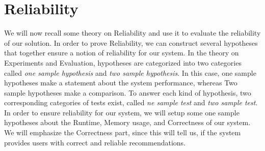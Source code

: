 \section{Reliability}
We will now recall some theory on Reliability and use it to evaluate the reliability of our solution. In order to prove Reliability, we can construct several hypotheses that together ensure a notion of reliability for our system. In the theory on
Experiments and Evaluation, hypotheses are categorized into two categories called \textit{one sample hypothesis} and \textit{two sample hypothesis}. In this case, one sample hypotheses make a statement about the system performance, whereas Two sample hypotheses make a comparison. To answer each kind of hypothesis, two corresponding categories of tests exist, called \textit{ne sample test} and \textit{two sample test}.
In order to ensure reliability for our system, we will setup some one sample hypotheses about the Runtime, Memory usage, and Correctness of our system. We will emphasize the Correctness part, since this will tell us, if the system provides users with correct and reliable recommendations.   
